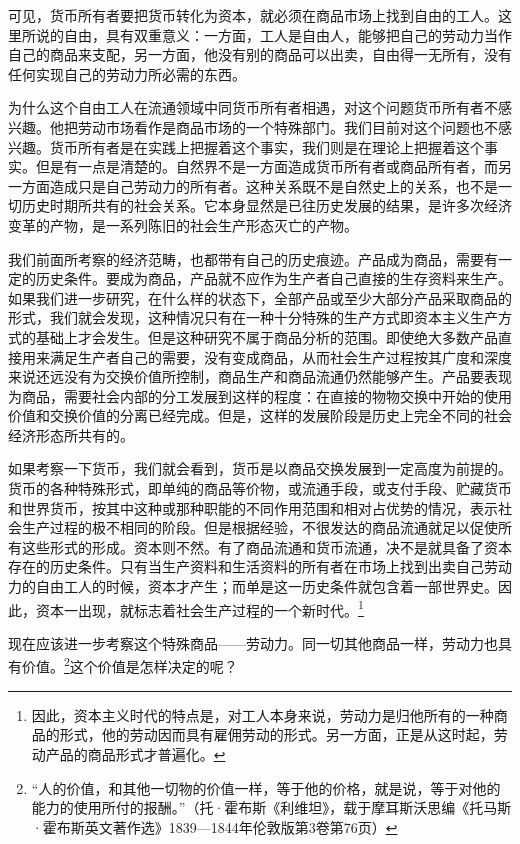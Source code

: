 \documentclass{ctexbook}
\begin{document}
    可见，货币所有者要把货币转化为资本，就必须在商品市场上找到自由的工人。这里所说的自由，具有双重意义：一方面，工人是自由人，能够把自己的劳动力当作自己的商品来支配，另一方面，他没有别的商品可以出卖，自由得一无所有，没有任何实现自己的劳动力所必需的东西。

    为什么这个自由工人在流通领域中同货币所有者相遇，对这个问题货币所有者不感兴趣。他把劳动市场看作是商品市场的一个特殊部门。我们目前对这个问题也不感兴趣。货币所有者是在实践上把握着这个事实，我们则是在理论上把握着这个事实。但是有一点是清楚的。自然界不是一方面造成货币所有者或商品所有者，而另一方面造成只是自己劳动力的所有者。这种关系既不是自然史上的关系，也不是一切历史时期所共有的社会关系。它本身显然是已往历史发展的结果，是许多次经济变革的产物，是一系列陈旧的社会生产形态灭亡的产物。

    我们前面所考察的经济范畴，也都带有自己的历史痕迹。产品成为商品，需要有一定的历史条件。要成为商品，产品就不应作为生产者自己直接的生存资料来生产。如果我们进一步研究，在什么样的状态下，全部产品或至少大部分产品采取商品的形式，我们就会发现，这种情况只有在一种十分特殊的生产方式即资本主义生产方式的基础上才会发生。但是这种研究不属于商品分析的范围。即使绝大多数产品直接用来满足生产者自己的需要，没有变成商品，从而社会生产过程按其广度和深度来说还远没有为交换价值所控制，商品生产和商品流通仍然能够产生。产品要表现为商品，需要社会内部的分工发展到这样的程度：在直接的物物交换中开始的使用价值和交换价值的分离已经完成。但是，这样的发展阶段是历史上完全不同的社会经济形态所共有的。

    如果考察一下货币，我们就会看到，货币是以商品交换发展到一定高度为前提的。货币的各种特殊形式，即单纯的商品等价物，或流通手段，或支付手段、贮藏货币和世界货币，按其中这种或那种职能的不同作用范围和相对占优势的情况，表示社会生产过程的极不相同的阶段。但是根据经验，不很发达的商品流通就足以促使所有这些形式的形成。资本则不然。有了商品流通和货币流通，决不是就具备了资本存在的历史条件。只有当生产资料和生活资料的所有者在市场上找到出卖自己劳动力的自由工人的时候，资本才产生；而单是这一历史条件就包含着一部世界史。因此，资本一出现，就标志着社会生产过程的一个新时代。\footnote{因此，资本主义时代的特点是，对工人本身来说，劳动力是归他所有的一种商品的形式，他的劳动因而具有雇佣劳动的形式。另一方面，正是从这时起，劳动产品的商品形式才普遍化。}

    现在应该进一步考察这个特殊商品——劳动力。同一切其他商品一样，劳动力也具有价值。\footnote{“人的价值，和其他一切物的价值一样，等于他的价格，就是说，等于对他的能力的使用所付的报酬。”（托·霍布斯《利维坦》，载于摩耳斯沃思编《托马斯·霍布斯英文著作选》1839—1844年伦敦版第3卷第76页）}这个价值是怎样决定的呢？
\end{document}

